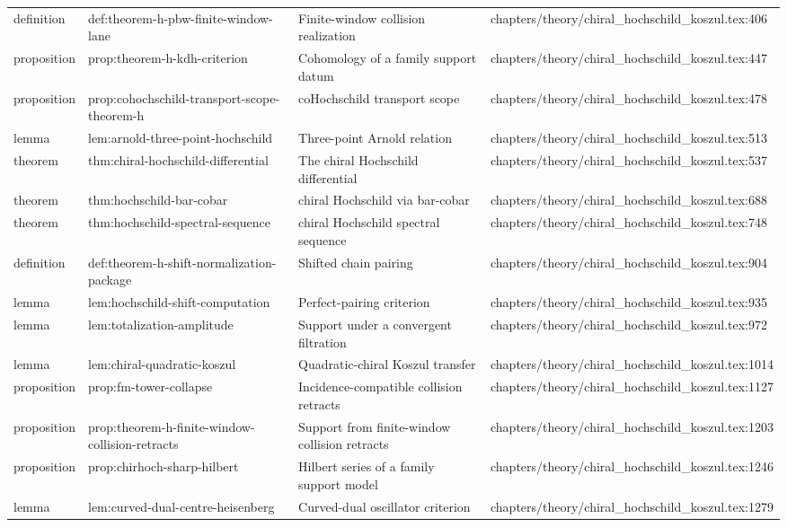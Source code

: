 \documentclass[11pt]{article}
\begin{document}
\begin{longtable}{L{0.10\textwidth}L{0.26\textwidth}L{0.42\textwidth}L{0.22\textwidth}}
definition & def:theorem-h-pbw-finite-window-lane & Finite-window collision realization & chapters/theory/chiral\_hochschild\_koszul.tex:406\\
proposition & prop:theorem-h-kdh-criterion & Cohomology of a family support datum & chapters/theory/chiral\_hochschild\_koszul.tex:447\\
proposition & prop:cohochschild-transport-scope-theorem-h & coHochschild transport scope & chapters/theory/chiral\_hochschild\_koszul.tex:478\\
lemma & lem:arnold-three-point-hochschild & Three-point Arnold relation & chapters/theory/chiral\_hochschild\_koszul.tex:513\\
theorem & thm:chiral-hochschild-differential & The chiral Hochschild differential & chapters/theory/chiral\_hochschild\_koszul.tex:537\\
theorem & thm:hochschild-bar-cobar & chiral Hochschild via bar-cobar & chapters/theory/chiral\_hochschild\_koszul.tex:688\\
theorem & thm:hochschild-spectral-sequence & chiral Hochschild spectral sequence & chapters/theory/chiral\_hochschild\_koszul.tex:748\\
definition & def:theorem-h-shift-normalization-package & Shifted chain pairing & chapters/theory/chiral\_hochschild\_koszul.tex:904\\
lemma & lem:hochschild-shift-computation & Perfect-pairing criterion & chapters/theory/chiral\_hochschild\_koszul.tex:935\\
lemma & lem:totalization-amplitude & Support under a convergent filtration & chapters/theory/chiral\_hochschild\_koszul.tex:972\\
lemma & lem:chiral-quadratic-koszul & Quadratic-chiral Koszul transfer & chapters/theory/chiral\_hochschild\_koszul.tex:1014\\
proposition & prop:fm-tower-collapse & Incidence-compatible collision retracts & chapters/theory/chiral\_hochschild\_koszul.tex:1127\\
proposition & prop:theorem-h-finite-window-collision-retracts & Support from finite-window collision retracts & chapters/theory/chiral\_hochschild\_koszul.tex:1203\\
proposition & prop:chirhoch-sharp-hilbert & Hilbert series of a family support model & chapters/theory/chiral\_hochschild\_koszul.tex:1246\\
lemma & lem:curved-dual-centre-heisenberg & Curved-dual oscillator criterion & chapters/theory/chiral\_hochschild\_koszul.tex:1279\\

\end{longtable}
\end{document}
